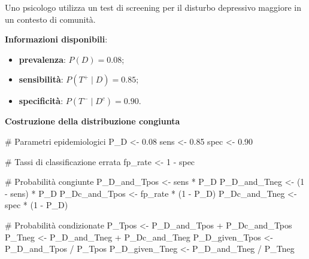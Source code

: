 \documentclass[
  italian,
  letterpaper,
  a4paper,
  11pt,
  open=any]{scrbook}
\newenvironment{Shaded}{\begin{snugshade}}{\end{snugshade}}
\newcommand{\CommentTok}[1]{\textcolor[rgb]{0.37,0.37,0.37}{#1}}
\newcommand{\DecValTok}[1]{\textcolor[rgb]{0.68,0.00,0.00}{#1}}
\newcommand{\FloatTok}[1]{\textcolor[rgb]{0.68,0.00,0.00}{#1}}
\newcommand{\NormalTok}[1]{\textcolor[rgb]{0.00,0.23,0.31}{#1}}
\newcommand{\OtherTok}[1]{\textcolor[rgb]{0.00,0.23,0.31}{#1}}
\newcommand{\SpecialCharTok}[1]{\textcolor[rgb]{0.37,0.37,0.37}{#1}}
\providecommand{\tightlist}{%
  \setlength{\itemsep}{0pt}\setlength{\parskip}{0pt}}
\theoremstyle{plain}
\theoremstyle{definition}
\theoremstyle{definition}
\theoremstyle{remark}
\begin{document}
\begin{tcolorbox}[enhanced jigsaw, arc=.35mm, bottomrule=.15mm, bottomtitle=1mm, breakable, colback=white, colbacktitle=quarto-callout-note-color!10!white, colframe=quarto-callout-note-color-frame, coltitle=black, left=2mm, leftrule=.75mm, opacityback=0, opacitybacktitle=0.6, rightrule=.15mm, title=\textcolor{quarto-callout-note-color}{\faInfo}\hspace{0.5em}{Esempio clinico: test di screening per la depressione}, titlerule=0mm, toprule=.15mm, toptitle=1mm]

Uno psicologo utilizza un test di screening per il disturbo depressivo
maggiore in un contesto di comunità.

\textbf{Informazioni disponibili}:

\begin{itemize}
\tightlist
\item
  \textbf{prevalenza}: \(P(D) = 0.08\);
\item
  \textbf{sensibilità}: \(P(T^+ \mid D) = 0.85\);
\item
  \textbf{specificità}: \(P(T^- \mid D^c) = 0.90\).
\end{itemize}

\textbf{Costruzione della distribuzione congiunta}

\begin{Shaded}
\begin{Highlighting}[]
\CommentTok{\# Parametri epidemiologici}
\NormalTok{P\_D }\OtherTok{\textless{}{-}} \FloatTok{0.08}
\NormalTok{sens }\OtherTok{\textless{}{-}} \FloatTok{0.85}
\NormalTok{spec }\OtherTok{\textless{}{-}} \FloatTok{0.90}

\CommentTok{\# Tassi di classificazione errata}
\NormalTok{fp\_rate }\OtherTok{\textless{}{-}} \DecValTok{1} \SpecialCharTok{{-}}\NormalTok{ spec}

\CommentTok{\# Probabilità congiunte}
\NormalTok{P\_D\_and\_Tpos }\OtherTok{\textless{}{-}}\NormalTok{ sens }\SpecialCharTok{*}\NormalTok{ P\_D}
\NormalTok{P\_D\_and\_Tneg }\OtherTok{\textless{}{-}}\NormalTok{ (}\DecValTok{1} \SpecialCharTok{{-}}\NormalTok{ sens) }\SpecialCharTok{*}\NormalTok{ P\_D}
\NormalTok{P\_Dc\_and\_Tpos }\OtherTok{\textless{}{-}}\NormalTok{ fp\_rate }\SpecialCharTok{*}\NormalTok{ (}\DecValTok{1} \SpecialCharTok{{-}}\NormalTok{ P\_D)}
\NormalTok{P\_Dc\_and\_Tneg }\OtherTok{\textless{}{-}}\NormalTok{ spec }\SpecialCharTok{*}\NormalTok{ (}\DecValTok{1} \SpecialCharTok{{-}}\NormalTok{ P\_D)}

\CommentTok{\# Probabilità condizionate}
\NormalTok{P\_Tpos }\OtherTok{\textless{}{-}}\NormalTok{ P\_D\_and\_Tpos }\SpecialCharTok{+}\NormalTok{ P\_Dc\_and\_Tpos}
\NormalTok{P\_Tneg }\OtherTok{\textless{}{-}}\NormalTok{ P\_D\_and\_Tneg }\SpecialCharTok{+}\NormalTok{ P\_Dc\_and\_Tneg}
\NormalTok{P\_D\_given\_Tpos }\OtherTok{\textless{}{-}}\NormalTok{ P\_D\_and\_Tpos }\SpecialCharTok{/}\NormalTok{ P\_Tpos}
\NormalTok{P\_D\_given\_Tneg }\OtherTok{\textless{}{-}}\NormalTok{ P\_D\_and\_Tneg }\SpecialCharTok{/}\NormalTok{ P\_Tneg}
\end{Highlighting}
\end{Shaded}


\end{tcolorbox}
\end{document}
